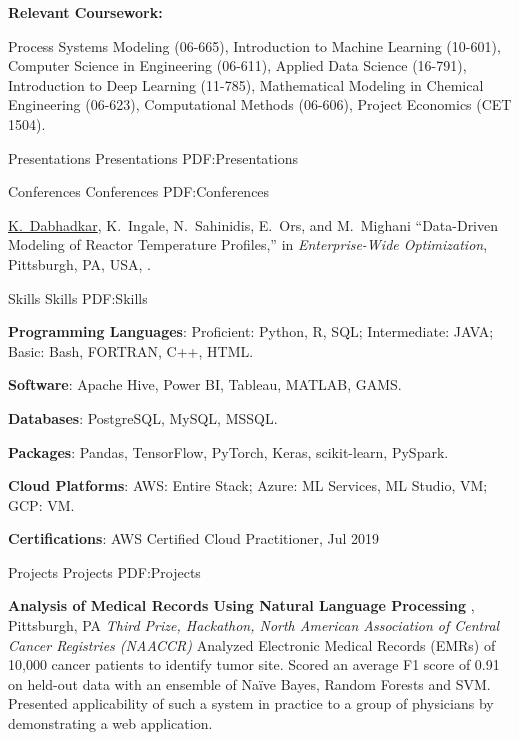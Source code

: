 \documentclass[letterpaper,MMMyyyy,nonstopmode]{simpleresumecv}
\begin{document}
\begin{Body}
\BigGap
\Entry
{\textbf{Relevant Coursework:}}

Process Systems Modeling (06-665), Introduction to Machine Learning (10-601), Computer Science in Engineering (06-611), Applied Data Science (16-791), Introduction to Deep Learning (11-785), Mathematical Modeling in Chemical Engineering (06-623), Computational Methods (06-606), Project Economics (CET 1504).

\newpage


\Section
{Presentations}
{Presentations}
{PDF:Presentations}

\SubSection
{Conferences}
{Conferences}
{PDF:Conferences}

\begingroup
\renewcommand{\MaxNumberedItem}{[88]}

\BigGap
\NumberedItem{[1]}
{\underline{K.~Dabhadkar}, K.~Ingale, N.~Sahinidis, E.~Ors, and M.~Mighani
``Data-Driven Modeling of Reactor Temperature Profiles,''
in \textit{Enterprise-Wide Optimization},
Pittsburgh,
PA,
USA,
.}



\Section
{Skills}
{Skills}
{PDF:Skills}

\textbf{Programming Languages}: \newline
Proficient: Python, R, SQL;  Intermediate: JAVA;	Basic: Bash, FORTRAN, C++, HTML.

\textbf{Software}: Apache Hive, Power BI, Tableau, MATLAB, GAMS.

\textbf{Databases}: PostgreSQL, MySQL, MSSQL.

\textbf{Packages}: Pandas, TensorFlow, PyTorch, Keras, scikit-learn, PySpark.

\textbf{Cloud Platforms}: AWS: Entire Stack; Azure: ML Services, ML Studio, VM; GCP: VM.

\textbf{Certifications}: AWS Certified Cloud Practitioner, Jul 2019


\Section
{Projects}
{Projects}
{PDF:Projects}


\Entry
{\textbf{Analysis of Medical Records Using Natural Language Processing }},
Pittsburgh, PA
\hfill
{}
\Entry
\textit{Third Prize, Hackathon, North American Association of Central Cancer Registries (NAACCR)}
\BulletItem
Analyzed Electronic Medical Records (EMRs) of 10,000 cancer patients to identify tumor site.
\BulletItem
Scored an average F1 score of 0.91 on held-out data with an ensemble of Naïve Bayes, Random Forests and SVM.
\BulletItem
Presented applicability of such a system in practice to a group of physicians by demonstrating a web application.


\end{Body}
\end{document}
